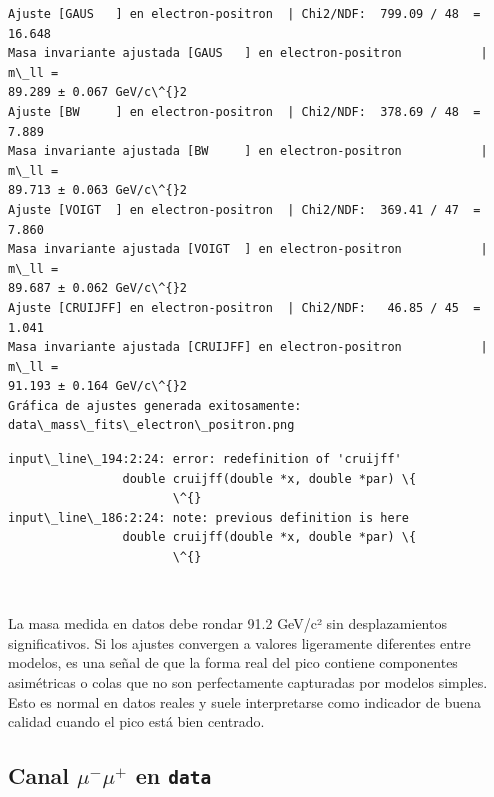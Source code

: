 \documentclass[11pt]{article}
\begin{document}
    \begin{Verbatim}[commandchars=\\\{\}]
Ajuste [GAUS   ] en electron-positron  | Chi2/NDF:  799.09 / 48  = 16.648
Masa invariante ajustada [GAUS   ] en electron-positron           | m\_ll =
89.289 ± 0.067 GeV/c\^{}2
Ajuste [BW     ] en electron-positron  | Chi2/NDF:  378.69 / 48  = 7.889
Masa invariante ajustada [BW     ] en electron-positron           | m\_ll =
89.713 ± 0.063 GeV/c\^{}2
Ajuste [VOIGT  ] en electron-positron  | Chi2/NDF:  369.41 / 47  = 7.860
Masa invariante ajustada [VOIGT  ] en electron-positron           | m\_ll =
89.687 ± 0.062 GeV/c\^{}2
Ajuste [CRUIJFF] en electron-positron  | Chi2/NDF:   46.85 / 45  = 1.041
Masa invariante ajustada [CRUIJFF] en electron-positron           | m\_ll =
91.193 ± 0.164 GeV/c\^{}2
Gráfica de ajustes generada exitosamente: data\_mass\_fits\_electron\_positron.png
    \end{Verbatim}

    \begin{Verbatim}[commandchars=\\\{\}]
input\_line\_194:2:24: error: redefinition of 'cruijff'
                double cruijff(double *x, double *par) \{
                       \^{}
input\_line\_186:2:24: note: previous definition is here
                double cruijff(double *x, double *par) \{
                       \^{}
    \end{Verbatim}

    \begin{center}
    \end{center}
    { \hspace*{\fill} \\}
    
    La masa medida en datos debe rondar 91.2 GeV/c² sin desplazamientos
significativos. Si los ajustes convergen a valores ligeramente
diferentes entre modelos, es una señal de que la forma real del pico
contiene componentes asimétricas o colas que no son perfectamente
capturadas por modelos simples. Esto es normal en datos reales y suele
interpretarse como indicador de buena calidad cuando el pico está bien
centrado.

    \hypertarget{canal-mu-mu-en-data}{%
\subsection{\texorpdfstring{Canal \(\mu^-\mu^+\) en
\texttt{data}}{Canal \textbackslash mu\^{}-\textbackslash mu\^{}+ en data}}\label{canal-mu-mu-en-data}}
\end{document}
